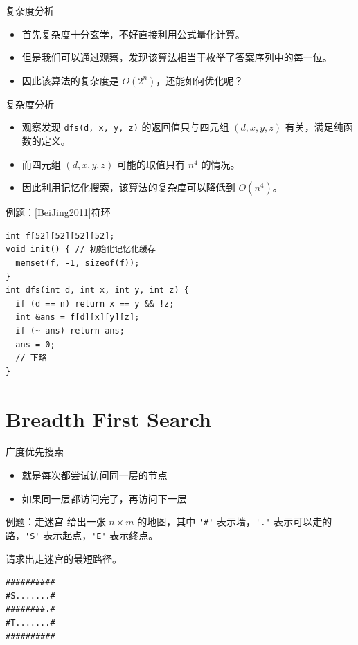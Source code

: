 \documentclass[12pt,aspectratio=169]{beamer}
\begin{document}
\begin{frame}[fragile]{复杂度分析}
  \begin{itemize}
    \item 首先复杂度十分玄学，不好直接利用公式量化计算。
    \item 但是我们可以通过观察，发现该算法相当于枚举了答案序列中的每一位。
    \item 因此该算法的复杂度是 $O(2^n)$，还能如何优化呢？
  \end{itemize}
\end{frame}

\begin{frame}[fragile]{复杂度分析}
  \begin{itemize}
    \item 观察发现 \verb|dfs(d, x, y, z)| 的返回值只与四元组 $(d, x, y, z)$ 有关，满足纯函数的定义。
    \item 而四元组 $(d, x, y, z)$ 可能的取值只有 $n^4$ 的情况。
    \item 因此利用记忆化搜索，该算法的复杂度可以降低到 $O(n^4)$。
  \end{itemize}
\end{frame}

\begin{frame}[fragile]{例题：[BeiJing2011]符环}
  \begin{verbatim}
int f[52][52][52][52];
void init() { // 初始化记忆化缓存
  memset(f, -1, sizeof(f));
}
int dfs(int d, int x, int y, int z) {
  if (d == n) return x == y && !z;
  int &ans = f[d][x][y][z];
  if (~ ans) return ans;
  ans = 0;
  // 下略
}
  \end{verbatim}
\end{frame}

\section[广度优先搜索]{Breadth First Search}

\begin{frame}[fragile]{广度优先搜索}
  \begin{itemize}
    \item 就是每次都尝试访问同一层的节点
    \item 如果同一层都访问完了，再访问下一层
  \end{itemize}
\end{frame}

\begin{frame}[fragile]{例题：走迷宫}
  给出一张 $n \times m$ 的地图，其中 \verb|'#'| 表示墙，\verb|'.'| 表示可以走的路，\verb|'S'| 表示起点，\verb|'E'| 表示终点。

  请求出走迷宫的最短路径。

  \begin{verbatim}
##########
#S.......#
########.#
#T.......#
##########
  \end{verbatim}
\end{frame}
\end{document}
